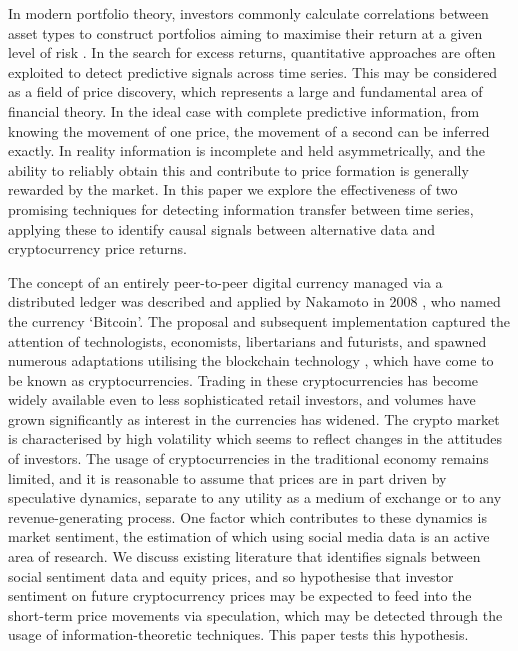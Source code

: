\documentclass[]{rsos}%
\begin{document}
  In modern portfolio theory, investors commonly calculate correlations between asset types to construct portfolios aiming to maximise their return at a given level of risk \cite{markowitz1952portfolio}. In the search for excess returns, quantitative approaches are often exploited to detect predictive signals across time series. This may be considered as a field of price discovery, which represents a large and fundamental area of financial theory. In the ideal case {with complete predictive information, \color{blue}from} knowing the movement of one price, the movement of a second can be inferred exactly. In reality information is incomplete and held asymmetrically, and the ability to reliably obtain this and contribute to price formation is generally rewarded by the market. In this paper we explore the effectiveness of two promising techniques for detecting information transfer between time series, applying these to identify causal signals between alternative data and cryptocurrency price returns. 

  The concept of an entirely peer-to-peer digital currency managed via a distributed ledger was described and applied by Nakamoto in 2008 \cite{nakamoto2008bitcoin}, who named the currency `Bitcoin'. The proposal and subsequent implementation captured the attention of technologists, economists, libertarians and futurists, and spawned numerous adaptations utilising the blockchain technology \cite{aste2017blockchain}, which have come to be known as cryptocurrencies. Trading in these cryptocurrencies has become widely available even to less sophisticated retail investors, and volumes have grown significantly as interest in the currencies has widened. The crypto market is characterised by high volatility which seems to reflect changes in the attitudes of investors. The usage of cryptocurrencies in the traditional economy remains limited, and it is reasonable to assume that prices are in part driven by speculative dynamics, separate to any utility as a medium of exchange or to any revenue-generating process. %
  One factor which contributes to these dynamics is market sentiment, the estimation of which using social media data is an active area of research.  We discuss existing literature that identifies signals between social sentiment data and equity prices, and so hypothesise that investor sentiment on future cryptocurrency prices may be expected to feed into the short-term price movements via speculation, which may be detected through the usage of information-theoretic techniques. This paper tests this hypothesis. 
\end{document}
